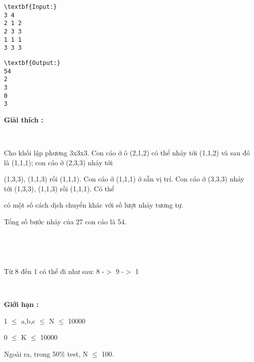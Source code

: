 \begin{verbatim}
\textbf{Input:}
3 4
2 1 2
2 3 3
1 1 1
3 3 3\end{verbatim}
\begin{verbatim}
\textbf{Output:}
54
2
3
0
3\end{verbatim}

\textbf{Giải thích : }

 

Cho khối lập phương 3x3x3. Con cáo ở ô (2,1,2) có thể nhảy tới (1,1,2) và sau đó là (1,1,1); con cáo ở (2,3,3) nhảy tới

(1,3,3), (1,1,3) rồi (1,1,1). Con cáo ở (1,1,1) ở sẵn vị trí. Con cáo ở (3,3,3) nhảy tới (1,3,3), (1,1,3) rồi (1,1,1). Có thể

có một số cách dịch chuyển khác với số lượt nhảy tương tự.

Tổng số bước nhảy của 27 con cáo là 54.

 

 

Từ 8 đến 1 có thể đi như sau: 8 -$>$ 9 -$>$ 1

 

\textbf{Giới hạn : }

1 $\le$ a,b,c $\le$ N $\le$ 10000

0 $\le$ K $\le$ 10000

Ngoài ra, trong 50\% test, N $\le$ 100.